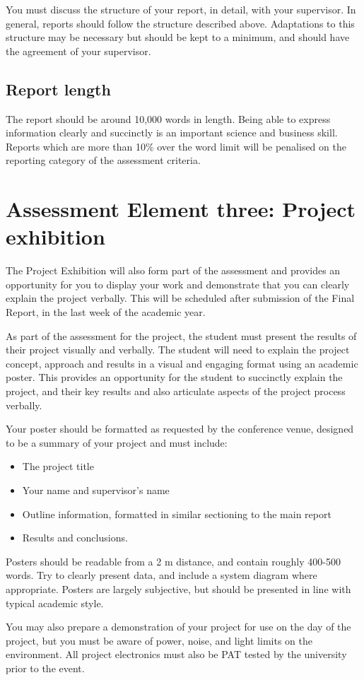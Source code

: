 You must discuss the structure of your report, in detail, with your supervisor. In general, reports should follow the structure described above. Adaptations to this structure may be necessary but should be kept to a minimum, and should have the agreement of your supervisor.


\subsection{Report length}

The report should be around 10,000 words in length. Being able to express information clearly and succinctly is an important science and business skill. Reports which are more than 10\% over the word limit will be penalised on the reporting category of the assessment criteria.

\section{Assessment Element three: Project exhibition}

The Project Exhibition will also form part of the assessment and provides an opportunity for you to display your work and demonstrate that you can clearly explain the project verbally. This will be scheduled after submission of the Final Report, in the last week of the academic year.

As part of the assessment for the project, the student must present the results of their project visually and verbally. The student will need to explain the project concept, approach and results in a visual and engaging format using an academic poster. This provides an opportunity for the student to succinctly explain the project, and their key results and also articulate aspects of the project process verbally.

Your poster should be formatted as requested by the conference venue, designed to be a summary of your project and must include:

\begin{itemize}
    \item The project title
    \item Your name and supervisor's name
    \item Outline information, formatted in similar sectioning to the main report
    \item Results and conclusions.
\end{itemize}

Posters should be readable from a 2 m distance, and contain roughly 400-500 words. Try to clearly present data, and include a system diagram where appropriate. Posters are largely subjective, but should be presented in line with typical academic style.

You may also prepare a demonstration of your project for use on the day of the project, but you must be aware of power, noise, and light limits on the environment. All project electronics must also be PAT tested by the university prior to the event.